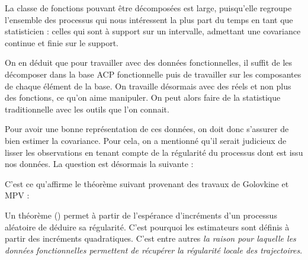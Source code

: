 \begin{rem}
	La classe de fonctions pouvant être décomposées est large, puisqu'elle regroupe l'ensemble des processus qui nous intéressent la plus part du temps en tant que statisticien : celles qui sont à support sur un intervalle, admettant une covariance continue et finie sur le support.
\end{rem}

On en déduit que pour travailler avec des données fonctionnelles, il suffit de les décomposer dans la base ACP fonctionnelle puis de travailler sur les composantes de chaque élément de la base. On travaille désormais avec des réels et non plus des fonctions, ce qu'on aime manipuler. On peut alors faire de la statistique traditionnelle avec les outils que l'on connait.


\begin{propriete*}
	\noindent{}
\end{propriete*}

Pour avoir une bonne représentation de ces données, on doit donc s'assurer de bien estimer la covariance. Pour cela, on a mentionné qu'il serait judicieux de lisser les observations en tenant compte de la régularité du processus dont est issu nos données. La question est désormais la suivante :


C'est ce qu'affirme le théorème suivant provenant des travaux de Golovkine et MPV :

\bigskip

\noindent\begin{minipage}{\textwidth}
\begin{thm*}
	\noindent{}
	\label{thm*:regularite_locale}
\end{thm*}
\end{minipage}
\begin{rem}
	Un théorème () permet à partir de l'espérance d'incréments d'un processus aléatoire de déduire sa régularité.
	C'est pourquoi les estimateurs sont définis à partir des incréments quadratiques. C'est entre autres \emph{la raison pour laquelle les données fonctionnelles permettent de récupérer la régularité locale des trajectoires}.

	\label{rem:kolmo_continuite}
\end{rem}

